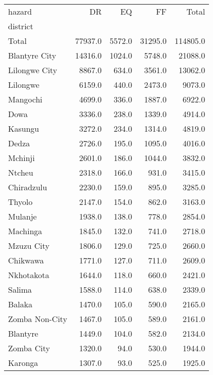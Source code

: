 \begin{tabular}{lrrrr}
\toprule
hazard &       DR &      EQ &       FF &     Total \\
district       &          &         &          &           \\
\midrule
Total          &  77937.0 &  5572.0 &  31295.0 &  114805.0 \\
Blantyre City  &  14316.0 &  1024.0 &   5748.0 &   21088.0 \\
Lilongwe City  &   8867.0 &   634.0 &   3561.0 &   13062.0 \\
Lilongwe       &   6159.0 &   440.0 &   2473.0 &    9073.0 \\
Mangochi       &   4699.0 &   336.0 &   1887.0 &    6922.0 \\
Dowa           &   3336.0 &   238.0 &   1339.0 &    4914.0 \\
Kasungu        &   3272.0 &   234.0 &   1314.0 &    4819.0 \\
Dedza          &   2726.0 &   195.0 &   1095.0 &    4016.0 \\
Mchinji        &   2601.0 &   186.0 &   1044.0 &    3832.0 \\
Ntcheu         &   2318.0 &   166.0 &    931.0 &    3415.0 \\
Chiradzulu     &   2230.0 &   159.0 &    895.0 &    3285.0 \\
Thyolo         &   2147.0 &   154.0 &    862.0 &    3163.0 \\
Mulanje        &   1938.0 &   138.0 &    778.0 &    2854.0 \\
Machinga       &   1845.0 &   132.0 &    741.0 &    2718.0 \\
Mzuzu City     &   1806.0 &   129.0 &    725.0 &    2660.0 \\
Chikwawa       &   1771.0 &   127.0 &    711.0 &    2609.0 \\
Nkhotakota     &   1644.0 &   118.0 &    660.0 &    2421.0 \\
Salima         &   1588.0 &   114.0 &    638.0 &    2339.0 \\
Balaka         &   1470.0 &   105.0 &    590.0 &    2165.0 \\
Zomba Non-City &   1467.0 &   105.0 &    589.0 &    2161.0 \\
Blantyre       &   1449.0 &   104.0 &    582.0 &    2134.0 \\
Zomba City     &   1320.0 &    94.0 &    530.0 &    1944.0 \\
Karonga        &   1307.0 &    93.0 &    525.0 &    1925.0 \\

\end{tabular}
